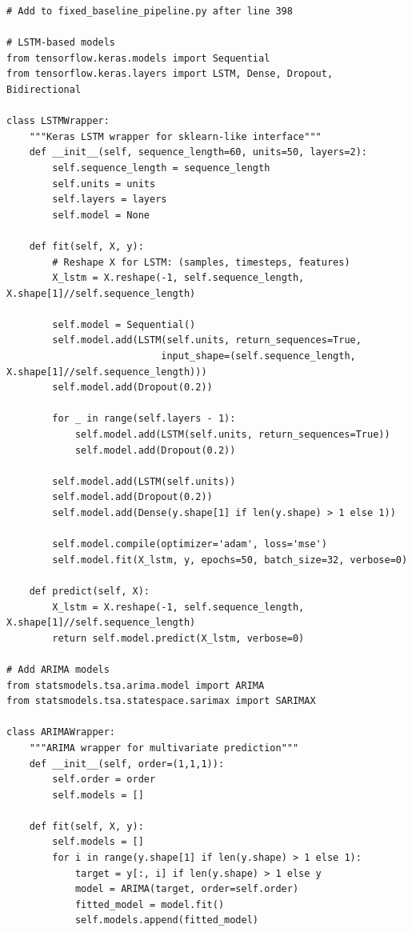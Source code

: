 \documentclass[11pt]{article}
\begin{document}
\begin{lstlisting}[style=pythonstyle, caption=Enhanced Baseline Models]
# Add to fixed_baseline_pipeline.py after line 398

# LSTM-based models
from tensorflow.keras.models import Sequential
from tensorflow.keras.layers import LSTM, Dense, Dropout, Bidirectional

class LSTMWrapper:
    """Keras LSTM wrapper for sklearn-like interface"""
    def __init__(self, sequence_length=60, units=50, layers=2):
        self.sequence_length = sequence_length
        self.units = units
        self.layers = layers
        self.model = None
        
    def fit(self, X, y):
        # Reshape X for LSTM: (samples, timesteps, features)
        X_lstm = X.reshape(-1, self.sequence_length, X.shape[1]//self.sequence_length)
        
        self.model = Sequential()
        self.model.add(LSTM(self.units, return_sequences=True, 
                           input_shape=(self.sequence_length, X.shape[1]//self.sequence_length)))
        self.model.add(Dropout(0.2))
        
        for _ in range(self.layers - 1):
            self.model.add(LSTM(self.units, return_sequences=True))
            self.model.add(Dropout(0.2))
            
        self.model.add(LSTM(self.units))
        self.model.add(Dropout(0.2))
        self.model.add(Dense(y.shape[1] if len(y.shape) > 1 else 1))
        
        self.model.compile(optimizer='adam', loss='mse')
        self.model.fit(X_lstm, y, epochs=50, batch_size=32, verbose=0)
        
    def predict(self, X):
        X_lstm = X.reshape(-1, self.sequence_length, X.shape[1]//self.sequence_length)
        return self.model.predict(X_lstm, verbose=0)

# Add ARIMA models
from statsmodels.tsa.arima.model import ARIMA
from statsmodels.tsa.statespace.sarimax import SARIMAX

class ARIMAWrapper:
    """ARIMA wrapper for multivariate prediction"""
    def __init__(self, order=(1,1,1)):
        self.order = order
        self.models = []
        
    def fit(self, X, y):
        self.models = []
        for i in range(y.shape[1] if len(y.shape) > 1 else 1):
            target = y[:, i] if len(y.shape) > 1 else y
            model = ARIMA(target, order=self.order)
            fitted_model = model.fit()
            self.models.append(fitted_model)
            

\end{lstlisting}
\end{document}
